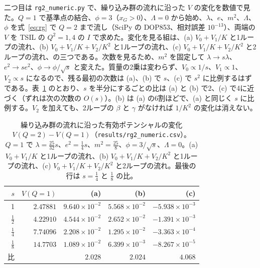 \documentclass[a4paper,10pt]{ltjsarticle}
\begin{document}
二つ目は \texttt{rg2\_numeric.py} で、繰り込み群の流れに沿った $V$ の変化を数値で見た。$Q=1$ で基準点の結合、$\phi=3$（$x_G>0$）、$\Lambda=0$ から始め、$\lambda$、$e$、$m^2$、$\Lambda$、$\phi$ を式~\eqref{eq:rg} で $Q=2$ まで流し（SciPy の DOP853、相対誤差 $10^{-13}$）、両端の $V$ を TSIL の $Q^2=1,4$ の $I$ で求めた。変化を見る組は、(a) $V_0+V_1/K$ と1ループの流れ、(b) $V_0+V_1/K+V_2/K^2$ と1ループの流れ、(c) $V_0+V_1/K+V_2/K^2$ と2ループの流れ、の三つである。次数を見るため、$m^2$ を固定して $\lambda\to s\lambda$、$e^2\to se^2$、$\phi\to\phi/\sqrt s$ と変えた。質量の2乗は変わらず、$V_0\propto1/s$、$V_1\propto1$、$V_2\propto s$ になるので、残る最初の次数は (a)、(b) で $s$、(c) で $s^2$ に比例するはずである。表~\ref{tab:rg2num} のとおり、$s$ を半分にするごとの比は (a) と (b) で2、(c) で4に近づく（ずれは次の次数の $O(s)$）。(b) は (a) の6割ほどで、(a) と同じく $s$ に比例する。$V_2$ を加えても、2ループの $\beta$ と $\gamma$ がなければ $1/K^2$ の変化は消えない。

\begin{table}[tbp]
\centering\small
\caption{繰り込み群の流れに沿った有効ポテンシャルの変化 $V(Q=2)-V(Q=1)$（\texttt{results/rg2\_numeric.csv}）。$Q=1$ で $\lambda=\frac{25}{32}s$、$e^2=\frac14s$、$m^2=\frac{25}8$、$\phi=3/\sqrt s$、$\Lambda=0$。(a) $V_0+V_1/K$ と1ループの流れ、(b) $V_0+V_1/K+V_2/K^2$ と1ループの流れ、(c) $V_0+V_1/K+V_2/K^2$ と2ループの流れ。最後の行は $s=\frac14$ と $\frac18$ の比。}
\label{tab:rg2num}
\begin{tabular}{rrrrr}
\toprule
$s$ & $V(Q=1)$ & (a) & (b) & (c) \\
\midrule
1 & $2.47881$ & $9.640\times10^{-2}$ & $5.568\times10^{-2}$ & $-5.938\times10^{-3}$ \\
$\frac12$ & $4.22910$ & $4.544\times10^{-2}$ & $2.652\times10^{-2}$ & $-1.391\times10^{-3}$ \\
$\frac14$ & $7.74096$ & $2.208\times10^{-2}$ & $1.295\times10^{-2}$ & $-3.363\times10^{-4}$ \\
$\frac18$ & $14.7703$ & $1.089\times10^{-2}$ & $6.399\times10^{-3}$ & $-8.267\times10^{-5}$ \\
\midrule
比 & & $2.028$ & $2.024$ & $4.068$ \\
\bottomrule
\end{tabular}
\end{table}
\end{document}
